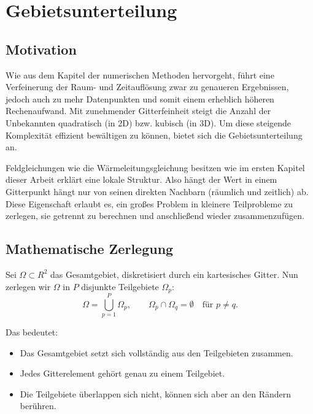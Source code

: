 %
%
\section{Gebietsunterteilung}
\label{parallelisierung:sec:Gebietsunterteilung}


\subsection{Motivation}
Wie aus dem Kapitel der numerischen Methoden hervorgeht, führt eine Verfeinerung der Raum- und Zeitauflösung zwar zu genaueren Ergebnissen, jedoch auch zu mehr Datenpunkten und somit einem erheblich höheren Rechenaufwand. 
Mit zunehmender Gitterfeinheit steigt die Anzahl der Unbekannten quadratisch (in 2D) bzw. kubisch (in 3D).  
Um diese steigende Komplexität effizient bewältigen zu können, bietet sich die Gebietsunterteilung an.

Feldgleichungen wie die Wärmeleitungsgleichung besitzen wie im ersten Kapitel dieser Arbeit erklärt eine lokale Struktur.
Also hängt der Wert in einem Gitterpunkt hängt nur von seinen direkten Nachbarn (räumlich und zeitlich) ab.  
Diese Eigenschaft erlaubt es, ein großes Problem in kleinere Teilprobleme zu zerlegen, sie getrennt zu berechnen und anschließend wieder zusammenzufügen.

\subsection{Mathematische Zerlegung}
Sei $\Omega \subset {R}^2$ das Gesamtgebiet, diskretisiert durch ein kartesisches Gitter.  
Nun zerlegen wir $\Omega$ in $P$ disjunkte Teilgebiete $\Omega_p$:
\begin{equation}
	\Omega = \bigcup_{p=1}^P \Omega_p,
	\qquad 
	\Omega_p \cap \Omega_q = \emptyset \quad \text{für } p \neq q.
\end{equation}

Das bedeutet:
\begin{itemize}
	\item Das Gesamtgebiet setzt sich vollständig aus den Teilgebieten zusammen.
	\item Jedes Gitterelement gehört genau zu einem Teilgebiet.
	\item Die Teilgebiete überlappen sich nicht, können sich aber an den Rändern berühren.
\end{itemize}

